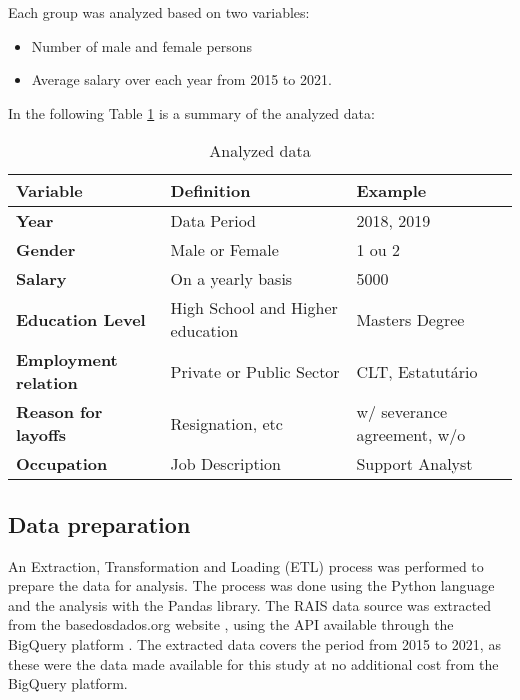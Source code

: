 Each group was analyzed based on two variables:

\begin{itemize}
	\item Number of male and female persons	      	      	      	      	      
	\item Average salary over each year from 2015 to 2021.	    
\end{itemize}
	      	      	      
In the following Table \ref{vars} is a summary of the analyzed data:     

\begin{table}[htbp]
	\caption{Analyzed data}
	\begin{center}
		\begin{tabular}{p{2cm}|p{3cm}|p{2cm}}
			\hline
				\textbf{Variable} & \textbf{Definition} & \textbf{Example}    \\
			\hline 
				\textbf{Year} & Data Period & 2018, 2019 \\
			\hline
				\textbf{Gender} & Male or Female & 1 ou 2 \\
			\hline
				\textbf{Salary} & On a yearly basis & 5000 \\
			\hline 
				\textbf{Education Level}  &  High School and Higher education &Masters Degree \\
			\hline 
			\textbf{Employment relation}    & Private or Public Sector  & CLT, Estatutário   \\
			\hline 
			\textbf{Reason for layoffs} & Resignation, etc & w/ severance agreement, w/o     \\
			\hline
			\textbf{Occupation}          & Job Description      & Support Analyst \\
			\hline 
		\end{tabular}
		\label{vars}
	\end{center} 
\end{table}      	      

\subsection{Data preparation}

An Extraction, Transformation and Loading (ETL) process was performed to prepare the data for analysis. The process was done using the Python language and the analysis with the Pandas library. The RAIS data source was extracted from the basedosdados.org website \cite{basedosdados}, using the API available through the BigQuery platform \cite{bigquery}. The extracted data covers the period from 2015 to 2021, as these were the data made available for this study at no additional cost from the BigQuery platform.

